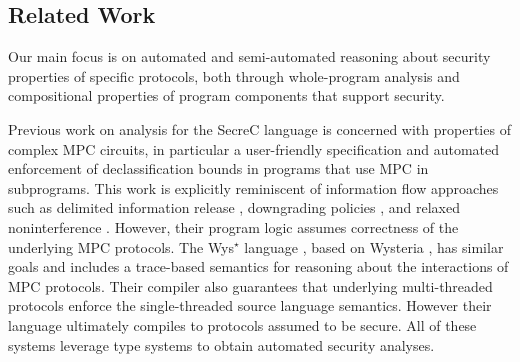 \subsection{Related Work}
\label{section-related-work}

Our main focus is on automated and semi-automated reasoning about
security properties of specific protocols, both through whole-program
analysis and compositional properties of program components that
support security.

Previous work on analysis for the SecreC language
\cite{almeida2018enforcing,10.1145/2637113.2637119} is concerned with
properties of complex MPC circuits, in particular a user-friendly
specification and automated enforcement of declassification bounds in
programs that use MPC in subprograms. This work is explicitly
reminiscent of information flow approaches such as delimited
information release \cite{10.1007/978-3-540-37621-7_9}, downgrading
policies \cite{li2005downgrading}, and relaxed noninterference
\cite{10.1145/1040305.1040319}. However, their program logic assumes
correctness of the underlying MPC protocols.  The Wys$^\star$ language
\cite{wysstar}, based on Wysteria \cite{rastogi2014wysteria}, has
similar goals and includes a trace-based semantics for reasoning about
the interactions of MPC protocols. Their compiler also guarantees that
underlying multi-threaded protocols enforce the single-threaded source
language semantics. However their language ultimately compiles to
protocols assumed to be secure.  All of these systems leverage type
systems to obtain automated security analyses.

